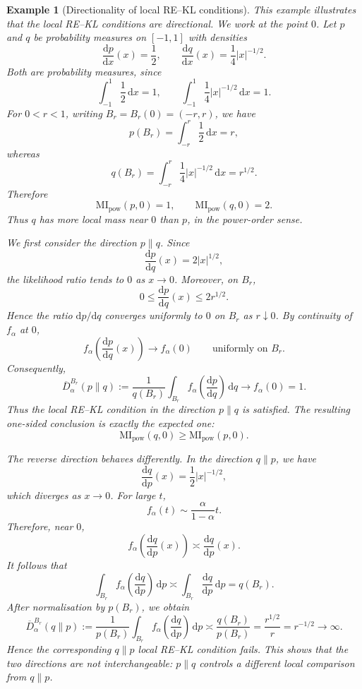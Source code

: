 \documentclass[11pt,a4paper]{article}
\newcommand{\MI}{\mathrm{MI}}
\theoremstyle{compactplain}
\theoremstyle{compactdefinition}
\newtheorem{example}[theorem]{Example}
\numberwithin{equation}{section}
\begin{document}
\begin{example}[Directionality of local RE--KL conditions]
\label{exp:dir}
This example illustrates that the local RE--KL conditions are directional.
We work at the point \(0\). Let \(p\) and \(q\) be probability measures on
\([-1,1]\) with densities
\[
\frac{\mathrm d p}{\mathrm d x}(x)=\frac12,
\qquad
\frac{\mathrm d q}{\mathrm d x}(x)=\frac14 |x|^{-1/2}.
\]
Both are probability measures, since
\[
\int_{-1}^{1} \frac12 \,\mathrm dx =1,
\qquad
\int_{-1}^{1} \frac14 |x|^{-1/2}\,\mathrm dx =1.
\]
For \(0<r<1\), writing \(B_r=B_r(0)=(-r,r)\), we have
\[
p(B_r)
=
\int_{-r}^{r}\frac12\,\mathrm dx
=
r,
\]
whereas
\[
q(B_r)
=
\int_{-r}^{r}\frac14 |x|^{-1/2}\,\mathrm dx
=
r^{1/2}.
\]
Therefore
\[
\MI_{\mathrm{pow}}(p,0)=1,
\qquad
\MI_{\mathrm{pow}}(q,0)=2.
\]
Thus \(q\) has more local mass near \(0\) than \(p\), in the power-order
sense.

We first consider the direction \(p\|q\). Since
\[
\frac{\mathrm d p}{\mathrm d q}(x)
=
2|x|^{1/2},
\]
the likelihood ratio tends to \(0\) as \(x\to0\). Moreover, on \(B_r\),
\[
0\le \frac{\mathrm d p}{\mathrm d q}(x)\le 2r^{1/2}.
\]
Hence the ratio \(\mathrm d p/\mathrm d q\) converges uniformly to \(0\)
on \(B_r\) as \(r\downarrow0\). By continuity of \(f_\alpha\) at \(0\),
\[
f_\alpha\!\left(\frac{\mathrm d p}{\mathrm d q}(x)\right)
\longrightarrow
f_\alpha(0)
\qquad
\text{uniformly on }B_r.
\]
Consequently,
\[
\overline D_\alpha^{B_r}(p\|q)
:=
\frac{1}{q(B_r)}
\int_{B_r}
f_\alpha\!\left(\frac{\mathrm d p}{\mathrm d q}\right)
\,\mathrm d q
\longrightarrow
f_\alpha(0)
=
1.
\]
Thus the local RE--KL condition in the direction \(p\|q\) is satisfied.
The resulting one-sided conclusion is exactly the expected one:
\[
\MI_{\mathrm{pow}}(q,0)
\ge
\MI_{\mathrm{pow}}(p,0).
\]

The reverse direction behaves differently. In the direction \(q\|p\), we have
\[
\frac{\mathrm d q}{\mathrm d p}(x)
=
\frac12 |x|^{-1/2},
\]
which diverges as \(x\to0\). For large \(t\),
\[
f_\alpha(t)
\sim
\frac{\alpha}{1-\alpha}t.
\]
Therefore, near \(0\),
\[
f_\alpha\!\left(\frac{\mathrm d q}{\mathrm d p}(x)\right)
\asymp
\frac{\mathrm d q}{\mathrm d p}(x).
\]
It follows that
\[
\int_{B_r}
f_\alpha\!\left(\frac{\mathrm d q}{\mathrm d p}\right)
\,\mathrm d p
\asymp
\int_{B_r}
\frac{\mathrm d q}{\mathrm d p}
\,\mathrm d p
=
q(B_r).
\]
After normalisation by \(p(B_r)\), we obtain
\[
\overline D_\alpha^{B_r}(q\|p)
:=
\frac{1}{p(B_r)}
\int_{B_r}
f_\alpha\!\left(\frac{\mathrm d q}{\mathrm d p}\right)
\,\mathrm d p
\asymp
\frac{q(B_r)}{p(B_r)}
=
\frac{r^{1/2}}{r}
=
r^{-1/2}
\longrightarrow
\infty.
\]
Hence the corresponding \(q\|p\) local RE--KL condition fails. This shows
that the two directions are not interchangeable: \(p\|q\) controls a
different local comparison from \(q\|p\).
\end{example}
\end{document}
